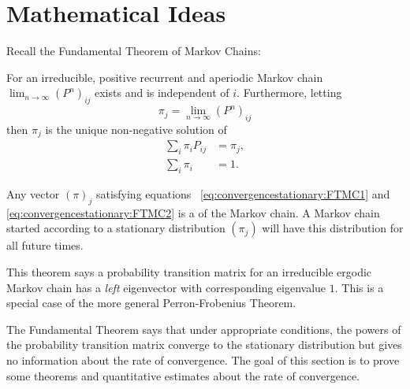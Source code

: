 \documentclass[12pt]{article}
\begin{document}
\hr

\section*{Mathematical Ideas}

Recall the Fundamental Theorem of Markov Chains:

\begin{theorem}
    For an irreducible, positive recurrent and aperiodic Markov chain \(
    \lim_{n \to \infty} (P^n)_{ij} \) exists and is independent of \( i \).
    Furthermore, letting
    \[
        \pi_j = \lim_{n \to \infty} (P^n)_{ij}
    \] then \( \pi_j \) is the unique non-negative solution of
    \begin{align}
        \sum\limits_{i} \pi_{i} P_{ij} &= \pi_{j},%
        \label{eq:convergencestationary:FTMC1}\\
        \sum\limits_{i} \pi_{i} &= 1.%
        \label{eq:convergencestationary:FTMC2}
    \end{align}
\end{theorem}

\begin{definition}
    Any vector \( (\pi)_{j} \) satisfying equations~%
    \ref{eq:convergencestationary:FTMC1} and~%
    \ref{eq:convergencestationary:FTMC2} is a %
    of the Markov chain.  A Markov chain started according to a
    stationary distribution \( (\pi_j) \) will have this distribution
    for all future times.
\end{definition}

\begin{remark}
    This theorem says a probability transition matrix for an irreducible
    ergodic Markov chain has a \emph{left} eigenvector with
    corresponding eigenvalue \( 1 \).  This is a special case of the
    more general Perron-Frobenius Theorem.
\end{remark}

\begin{remark}
    The Fundamental Theorem says that under appropriate conditions, the
    powers of the probability transition matrix converge to the
    stationary distribution but gives no information about the rate of
    convergence.  The goal of this section is to prove some theorems and
    quantitative estimates about the rate of convergence.
\end{remark}
\end{document}
